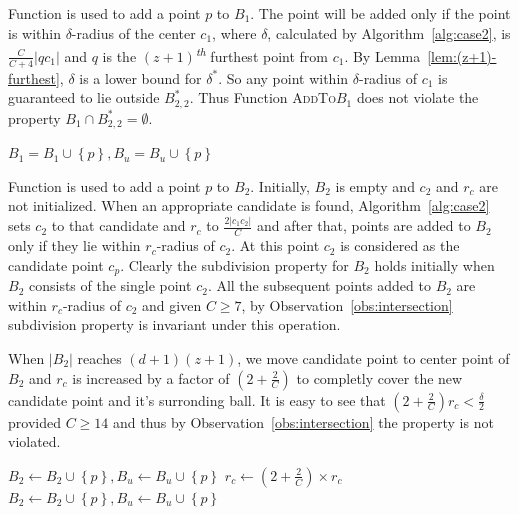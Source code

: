 \documentclass[envcountsame]{cls/cccg15}
\newcommand{\nth}{\textsuperscript{\textit{th}} }
\newcommand{\set}[1]{\left\{ #1 \right\}}
\newcommand{\card}[1]{\left|{#1}\right|}
\newcommand{\gee}{\geqslant}
\renewcommand{\ge}{\gee}
\begin{document}
Function  is used to add a point $p$ to $B_1$. The point will be added only if the point is within $\delta$\nobreakdash-radius of the center $c_1$, where $\delta$, calculated by Algorithm~\ref{alg:case2}, is $\frac{C}{C+4}\card{qc_1}$ and $q$ is the $(z+1)$\nth furthest point from $c_1$. By Lemma~\ref{lem:(z+1)-furthest}, $\delta$ is a lower bound for $\delta^*$. So any point within $\delta$-radius of $c_1$ is guaranteed to lie outside $B_{2,2}^*$. Thus Function \textsc{AddTo$B_1$} does not violate the property $B_1 \cap B_{2,2}^* = \emptyset$.
\begin{algorithmic}
		\State $B_1 = B_1 \cup \set{p}, B_u = B_u \cup \set{p}$
		\State {}
	\EndIf
	\State {}
\EndFunction
\end{algorithmic}

Function  is used to add a point $p$ to $B_2$. Initially, $B_2$ is empty and $c_2$ and $r_c$ are not initialized. When an appropriate candidate is found, Algorithm~\ref{alg:case2} sets $c_2$ to that candidate and $r_c$ to $\frac{2\card{c_1c_2}}{C}$ and after that, points are added to $B_2$ only if they lie within $r_c$-radius of $c_2$. At this point $c_2$ is considered as the candidate point $c_p$. Clearly the subdivision property for $B_2$ holds initially when $B_2$ consists of the single point $c_2$. All the subsequent points added to $B_2$ are within $r_c$-radius of $c_2$ and given $C\ge 7$, by Observation~\ref{obs:intersection} subdivision property is invariant under this operation.

When $\card{B_2}$ reaches $(d+1)(z+1)$, we move candidate point to center point of $B_2$ and $r_c$ is increased by a factor of $(2 + \frac{2}{C})$ to completly cover the new candidate point and it's surronding ball. It is easy to see that $(2 + \frac{2}{C})r_c < \frac{\delta}{2}$ provided $C \ge 14$ and thus by Observation~\ref{obs:intersection} the property is not violated.

\begin{algorithmic}
		\State $B_2 \gets B_2 \cup \set{p}, B_u \gets B_u \cup \set{p}$
		\If{$\card{B_2} = (d+1)(z+1)$}
			\State $r_c \gets  (2 + \frac{2}{C}) \times r_c$
					\State $B_2 \gets B_2 \cup \set{p}, B_u \gets B_u \cup \set{p}$
				\EndIf
			\EndFor
		\EndIf
		\State {}
	\EndIf
	\State {}
\EndFunction
\end{algorithmic}
\end{document}
